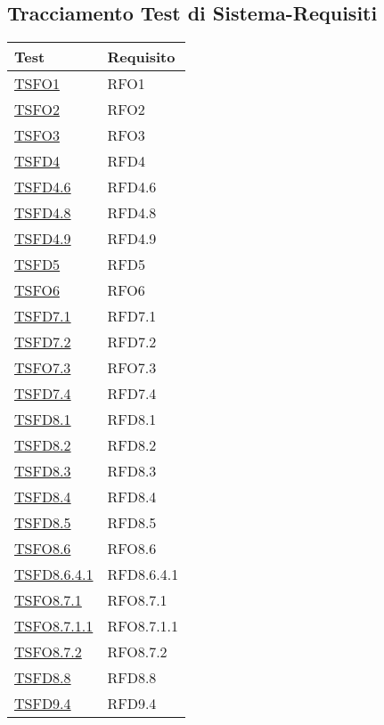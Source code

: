 \subsection{Tracciamento Test di Sistema-Requisiti}
\normalsize
\begin{longtable}[ht]{|>{\centering}m{5cm}|m{5cm}<{\centering}|}
\hline 
\textbf{Test} & \textbf{Requisito}\\
\hline
\endhead
\hyperlink{TSFO1}{TSFO1} & RFO1\\ \hline
\hyperlink{TSFO2}{TSFO2} & RFO2\\ \hline
\hyperlink{TSFO3}{TSFO3} & RFO3\\ \hline
\hyperlink{TSFD4}{TSFD4} & RFD4\\ \hline
\hyperlink{TSFD4.6}{TSFD4.6} & RFD4.6\\ \hline
\hyperlink{TSFD4.8}{TSFD4.8} & RFD4.8\\ \hline
\hyperlink{TSFD4.9}{TSFD4.9} & RFD4.9\\ \hline
\hyperlink{TSFD5}{TSFD5} & RFD5\\ \hline
\hyperlink{TSFO6}{TSFO6} & RFO6\\ \hline
\hyperlink{TSFD7.1}{TSFD7.1} & RFD7.1\\ \hline
\hyperlink{TSFD7.2}{TSFD7.2} & RFD7.2\\ \hline
\hyperlink{TSFO7.3}{TSFO7.3} & RFO7.3\\ \hline
\hyperlink{TSFD7.4}{TSFD7.4} & RFD7.4\\ \hline
\hyperlink{TSFD8.1}{TSFD8.1} & RFD8.1\\ \hline
\hyperlink{TSFD8.2}{TSFD8.2} & RFD8.2\\ \hline
\hyperlink{TSFD8.3}{TSFD8.3} & RFD8.3\\ \hline
\hyperlink{TSFD8.4}{TSFD8.4} & RFD8.4\\ \hline
\hyperlink{TSFD8.5}{TSFD8.5} & RFD8.5\\ \hline
\hyperlink{TSFO8.6}{TSFO8.6} & RFO8.6\\ \hline
\hyperlink{TSFD8.6.4.1}{TSFD8.6.4.1} & RFD8.6.4.1\\ \hline
\hyperlink{TSFO8.7.1}{TSFO8.7.1} & RFO8.7.1\\ \hline
\hyperlink{TSFO8.7.1.1}{TSFO8.7.1.1} & RFO8.7.1.1\\ \hline
\hyperlink{TSFO8.7.2}{TSFO8.7.2} & RFO8.7.2\\ \hline
\hyperlink{TSFD8.8}{TSFD8.8} & RFD8.8\\ \hline
\hyperlink{TSFD9.4}{TSFD9.4} & RFD9.4\\ \hline

\end{longtable}
